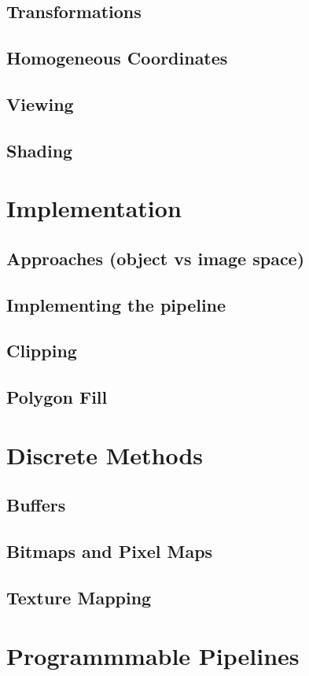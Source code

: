 \documentclass[11pt,a4paper]{article}
\begin{document}
	\subsection{Transformations}
	\subsection{Homogeneous Coordinates}
	\subsection{Viewing}
	\subsection{Shading}

\section{Implementation}
	\subsection{Approaches (object vs image space)}
	\subsection{Implementing the pipeline}
	\subsection{Clipping}
	\subsection{Polygon Fill}
	
\section{Discrete Methods}
	\subsection{Buffers}
	\subsection{Bitmaps and Pixel Maps}
	\subsection{Texture Mapping}

\section{Programmmable Pipelines}
\end{document}
